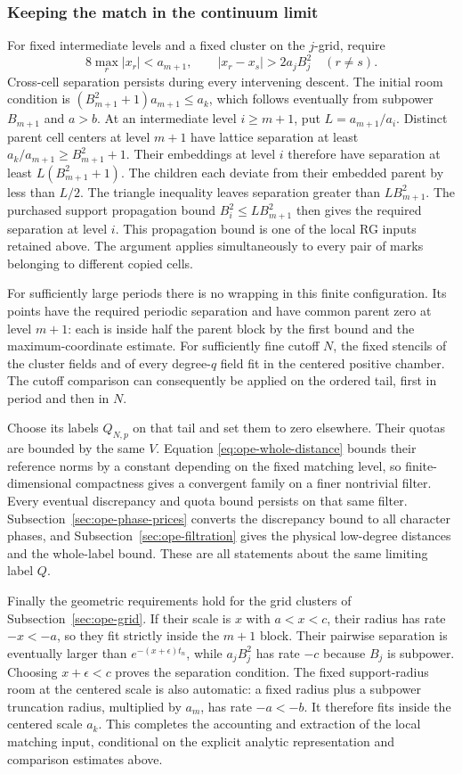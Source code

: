 \subsubsection{Keeping the match in the continuum limit}
For fixed intermediate levels and a fixed cluster on the $j$-grid,
require
\[
 8\max_r|x_r|<a_{m+1},\qquad
 |x_r-x_s|>2a_j B_j^2\quad(r\ne s).
\]
Cross-cell separation persists during every intervening descent.
The initial room condition is
$(B_{m+1}^2+1)a_{m+1}\leq a_k$, which follows eventually from
subpower $B_{m+1}$ and $a>b$. At an intermediate level $i\geq m+1$,
put $L=a_{m+1}/a_i$. Distinct parent cell centers at level $m+1$
have lattice separation at least $a_k/a_{m+1}\geq B_{m+1}^2+1$.
Their embeddings at level $i$ therefore have separation at least
$L(B_{m+1}^2+1)$. The children each deviate from their embedded
parent by less than $L/2$. The triangle inequality leaves separation
greater than $LB_{m+1}^2$. The purchased support propagation bound
$B_i^2\leq LB_{m+1}^2$ then gives the required separation at level
$i$. This propagation bound is one of the local RG inputs retained
above. The argument applies simultaneously to every pair of marks
belonging to different copied cells.

For sufficiently large periods there is no wrapping in this finite
configuration. Its points have the required periodic separation and
have common parent zero at level $m+1$: each is inside half the
parent block by the first bound and the maximum-coordinate estimate.
For sufficiently fine cutoff $N$, the fixed stencils of the cluster
fields and of every degree-$q$ field fit in the centered positive
chamber. The cutoff comparison can consequently be applied on the
ordered tail, first in period and then in $N$.

Choose its labels $Q_{N,p}$ on that tail and set them to zero
elsewhere. Their quotas are bounded by the same $V$. Equation
\eqref{eq:ope-whole-distance} bounds their reference norms by a
constant depending on the fixed matching level, so finite-dimensional
compactness gives a convergent family on a finer nontrivial filter.
Every eventual discrepancy and quota bound persists on that same
filter. Subsection~\ref{sec:ope-phase-prices} converts the discrepancy
bound to all character phases, and Subsection~\ref{sec:ope-filtration}
gives the physical low-degree distances and the whole-label bound.
These are all statements about the same limiting label $Q$.

Finally the geometric requirements hold for the grid clusters of
Subsection~\ref{sec:ope-grid}. If their scale is $x$ with $a<x<c$,
their radius has rate $-x<-a$, so they fit strictly inside the
$m+1$ block. Their pairwise separation is eventually larger than
$e^{-(x+\epsilon)t_n}$, while $a_jB_j^2$ has rate $-c$ because
$B_j$ is subpower. Choosing $x+\epsilon<c$ proves the separation
condition. The fixed support-radius room at the centered scale is
also automatic: a fixed radius plus a subpower truncation radius,
multiplied by $a_m$, has rate $-a<-b$. It therefore fits inside
the centered scale $a_k$. This completes the accounting and extraction
of the local matching input, conditional on the explicit analytic
representation and comparison estimates above.

